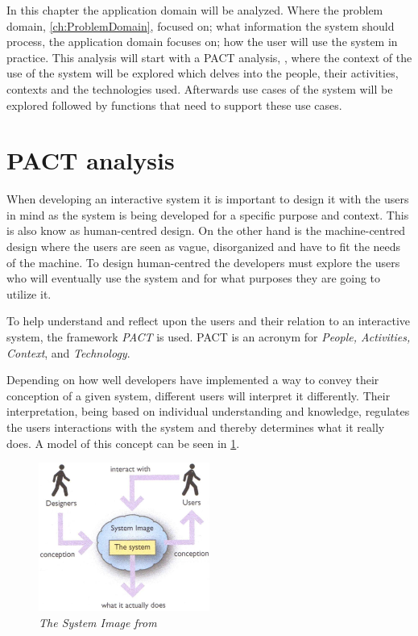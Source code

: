 
In this chapter the application domain will be analyzed.
Where the problem domain, \cref{ch:ProblemDomain}, focused on; what information the system should process, the application domain focuses on; how the user will use the system in practice.
This analysis will start with a PACT analysis, \cite{Benyon}, where the context of the use of the system will be explored which delves into the people, their activities, contexts and the technologies used.
Afterwards use cases of the system will be explored followed by functions that need to support these use cases.

\section{PACT analysis}\label{sec:PACT}
When developing an interactive system it is important to design it with the users in mind as the system is being developed for a specific purpose and context.
This is also know as human-centred design.
On the other hand is the machine-centred design where the users are seen as vague, disorganized and have to fit the needs of the machine.
To design human-centred the developers must explore the users who will eventually use the system and for what purposes they are going to utilize it. \cite{Benyon}

To help understand and reflect upon the users and their relation to an interactive system, the framework \textit{PACT} is used.
PACT is an acronym for \textit{People, Activities, Context}, and \textit{Technology}.

Depending on how well developers have implemented a way to convey their conception of a given system, different users will interpret it differently.
Their interpretation, being based on individual understanding and knowledge, regulates the users interactions with the system and thereby determines what it really does.
A model of this concept can be seen in \cref{fig:PACT-SystemImage}.

\begin{figure}[H]
	\centering
	\includegraphics[width=0.5\textwidth]{billeder/SystemImage-Benyon.jpg}
	\caption{\textit{The System Image from \citep[p.~31]{Benyon}}}
	\label{fig:PACT-SystemImage}
\end{figure}

